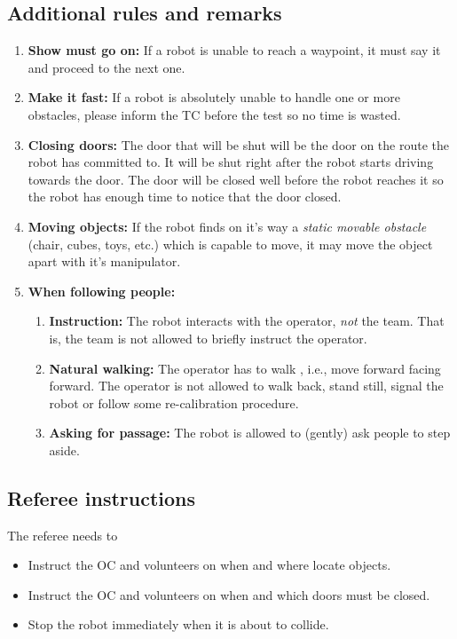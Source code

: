 \subsection{Additional rules and remarks}
\begin{enumerate}
	\item \textbf{Show must go on:} If a robot is unable to reach a waypoint, it must say it and proceed to the next one.
	\item \textbf{Make it fast:} If a robot is absolutely unable to handle one or more obstacles, please inform the TC before the test so no time is wasted.
	\item \textbf{Closing doors:}  The door that will be shut will be the door on the route the robot has committed to. It will be shut right after the robot starts driving towards the door. The door will be closed well before the robot reaches it so the robot has enough time to notice that the door closed.	
	\item \textbf{Moving objects:} If the robot finds on it's way a \textit{static movable obstacle} (chair, cubes, toys, etc.) which is capable to move, it may move the object apart with it's manipulator.
	\item \textbf{When following people:} 
	\begin{enumerate}
		\item \textbf{Instruction:} The robot interacts with the operator, \emph{not} the team. That is, the team is not allowed to briefly instruct the operator.
		\item \textbf{Natural walking:} The operator has to walk , i.e., move forward facing forward. The operator is not allowed to walk back, stand still, signal the robot or follow some re-calibration procedure.
		\item \textbf{Asking for passage:} The robot is allowed to (gently) ask people to step aside.
	\end{enumerate}
\end{enumerate}

\subsection{Referee instructions}

The referee needs to
\begin{itemize}
	\item Instruct the OC and volunteers on when and where locate objects.
	\item Instruct the OC and volunteers on when and which doors must be closed.
	\item Stop the robot immediately when it is about to collide.
\end{itemize}

